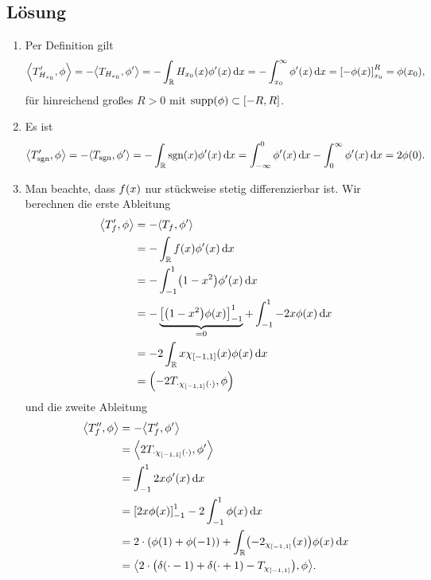 \documentclass{exercise}
\begin{document}
    \subsection*{Lösung}
    \begin{enumerate}
        \item Per Definition gilt
        \[
            \angles*{T_{H_{x_0}}', \phi} = -\angles*{T_{H_{x_0}}, \phi'} = -\int_\R H_{x_0}\parentheses*{x}\phi'\parentheses*{x}\d x = -\int_{x_0}^\infty \phi'\parentheses*{x}\d x = \brackets*{-\phi\parentheses*{x}}_{x_0}^R = \phi\parentheses*{x_0},
        \]
        für hinreichend großes \(R > 0\) mit \(\supp\parentheses*{\phi} \subset \brackets*{-R, R}\).
        \item Es ist
        \[
            \angles*{T_{\sgn}', \phi} = -\angles*{T_{\sgn}, \phi'} = -\int_\R \sgn\parentheses*{x}\phi'\parentheses*{x}\d x = \int_{-\infty}^0 \phi'\parentheses*{x}\d x - \int_0^\infty \phi'\parentheses*{x}\d x = 2\phi\parentheses*{0}.
        \]
        \item Man beachte, dass \(f\parentheses*{x}\) nur stückweise stetig differenzierbar ist.
        Wir berechnen die erste Ableitung
        \begin{align*}
            \angles*{T_f', \phi} &= -\angles*{T_f, \phi'}\\
            &= -\int_\R f\parentheses*{x}\phi'\parentheses*{x}\d x\\
            &= -\int_{-1}^1 \parentheses*{1 - x^2}\phi'\parentheses*{x}\d x\\
            &= -\underbrace{\brackets*{\parentheses*{1 - x^2}\phi\parentheses*{x}}_{-1}^1}_{= 0} + \int_{-1}^1 -2x\phi\parentheses*{x}\d x\\
            &= -2\int_\R x\chi_{\brackets*{-1, 1}}\parentheses*{x}\phi\parentheses*{x}\d x\\
            &= \parentheses*{-2T_{\cdot \chi_{\brackets*{-1, 1}}\parentheses*{\cdot}}, \phi}
        \end{align*}
        und die zweite Ableitung
        \begin{align*}
            \angles*{T_f'', \phi} &= -\angles*{T_f', \phi'}\\
            &= \angles*{2T_{\cdot\chi_{\brackets*{-1, 1}}\parentheses*{\cdot}}, \phi'}\\
            &= \int_{-1}^1 2x\phi'\parentheses*{x}\d x\\
            &= \brackets*{2x\phi\parentheses*{x}}_{-1}^1 - 2\int_{-1}^1 \phi\parentheses*{x}\d x\\
            &= 2 \cdot \parentheses*{\phi\parentheses*{1} + \phi\parentheses*{-1}} + \int_\R \parentheses*{-2_{\chi_{\brackets*{-1, 1}}}\parentheses*{x}}\phi\parentheses*{x}\d x\\
            &= \angles*{2 \cdot \parentheses*{\delta\parentheses*{\cdot - 1} + \delta\parentheses*{\cdot + 1} - T_{\chi_{\brackets*{-1, 1}}}}, \phi}.
        \end{align*}
    \end{enumerate}
\end{document}
